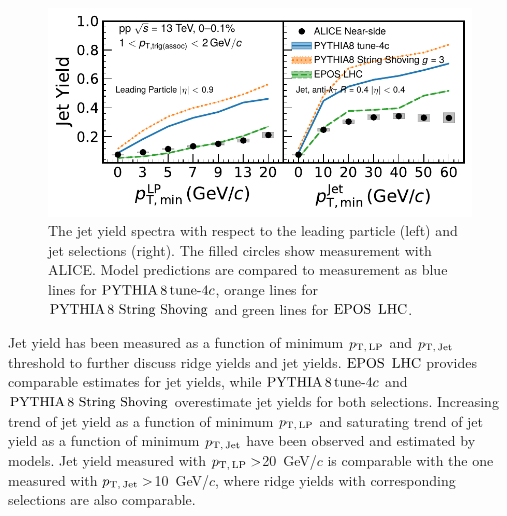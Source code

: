 \begin{figure}[h!]
	\centering
	\includegraphics[width=0.99\linewidth]{./figures/Fig9_JetYieldESE.pdf}
	\caption{The jet yield spectra with respect to the leading particle (left) and jet selections (right). The filled circles show measurement with ALICE. Model predictions are compared to measurement as blue lines for $\mathrm{PYTHIA}\,8\,\mathrm{tune}{\text -}4c$, orange lines for ${\mathrm{PYTHIA}\,8~\mathrm{String}~}\mathrm{Shoving}$ and green lines for ${\mathrm{EPOS}\,~\mathrm{LHC}}$.}
	\label{fig:RidgeYield_ESE}
\end{figure}

Jet yield has been measured as a function of minimum $p_\mathrm{T,\,LP}$ and $p_\mathrm{T,\,Jet}$ threshold to further discuss ridge yields and jet yields.
${\mathrm{EPOS}\,~\mathrm{LHC}}$ provides comparable estimates for jet yields, while $\mathrm{PYTHIA}\,8\,\mathrm{tune}{\text -}4c$ and ${\mathrm{PYTHIA}\,8~\mathrm{String}~}\mathrm{Shoving}$ overestimate jet yields for both selections. Increasing trend of jet yield as a function of minimum $p_\mathrm{T,\,LP}$ and saturating trend of jet yield as a function of minimum $p_\mathrm{T,\,Jet}$ have been observed and estimated by models. Jet yield measured with $p_\mathrm{T,\,LP}>$20~GeV/$c$ is comparable with the one measured with $p_\mathrm{T,\,Jet}>$10~GeV/$c$, where ridge yields with corresponding selections are also comparable.